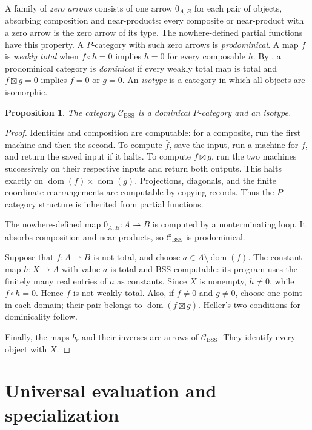 \documentclass[11pt]{article}
\newtheorem{proposition}[theorem]{Proposition}
\newcommand{\C}{\mathcal C_{\mathrm{BSS}}}
\newcommand{\pfn}{\rightharpoonup}
\newcommand{\dom}{\operatorname{dom}}
\begin{document}
A family of \emph{zero arrows} consists of one arrow $0_{A,B}$ for
each pair of objects, absorbing composition and near-products:
every composite or near-product with a zero arrow is the zero arrow
of its type. The nowhere-defined partial functions have this property.
A $P$-category with such zero arrows is \emph{prodominical}.
A map $f$ is \emph{weakly total} when
$f\circ h=0$ implies $h=0$ for every composable $h$.
By \cite[Proposition~5.1, p.~1261]{Heller90}, a prodominical category
is \emph{dominical} if every weakly total map is total and
$f\boxtimes g=0$ implies $f=0$ or $g=0$.
An \emph{isotype} is a category in which all objects are isomorphic.

\begin{proposition}\label{prop:dominical}
The category $\C$ is a dominical $P$-category and an isotype.
\end{proposition}

\begin{proof}
Identities and composition are computable: for a composite, run the
first machine and then the second. To compute $\bar f$, save the
input, run a machine for $f$, and return the saved input if it halts.
To compute $f\boxtimes g$, run the two machines successively on
their respective inputs and return both outputs. This halts exactly
on $\dom(f)\times\dom(g)$. Projections, diagonals, and the finite
coordinate rearrangements are computable by copying records.
Thus the $P$-category structure is inherited from partial functions.

The nowhere-defined map $0_{A,B}:A\pfn B$ is computed by a
nonterminating loop. It absorbs composition and near-products,
so $\C$ is prodominical.

Suppose that $f:A\pfn B$ is not total, and choose
$a\in A\setminus\dom(f)$. The constant map $h:X\to A$ with value
$a$ is total and BSS-computable: its program uses the finitely many
real entries of $a$ as constants. Since $X$ is nonempty,
$h\ne0$, while $f\circ h=0$. Hence $f$ is not weakly total.
Also, if $f\ne0$ and $g\ne0$, choose one point in each domain;
their pair belongs to $\dom(f\boxtimes g)$. Heller's two
conditions for dominicality follow.

Finally, the maps $b_r$ and their inverses are arrows of $\C$.
They identify every object with $X$.
\end{proof}

\section{Universal evaluation and specialization}
\label{sec:universal}
\end{document}
